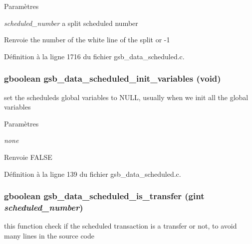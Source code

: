 \begin{DoxyParams}{Paramètres}
\item[{\em scheduled\_\-number}]a split scheduled number\end{DoxyParams}
\begin{DoxyReturn}{Renvoie}
the number of the white line of the split or -\/1 
\end{DoxyReturn}


Définition à la ligne 1716 du fichier gsb\_\-data\_\-scheduled.c.

\subsubsection[{gsb\_\-data\_\-scheduled\_\-init\_\-variables}]{\setlength{\rightskip}{0pt plus 5cm}gboolean gsb\_\-data\_\-scheduled\_\-init\_\-variables (void)}\label{gsb__data__scheduled_8c_a51f5cc190c15cd32d416a85460ac60a8}
set the scheduleds global variables to NULL, usually when we init all the global variables 
\begin{DoxyParams}{Paramètres}
\item[{\em none}]\end{DoxyParams}
\begin{DoxyReturn}{Renvoie}
FALSE 
\end{DoxyReturn}


Définition à la ligne 139 du fichier gsb\_\-data\_\-scheduled.c.

\subsubsection[{gsb\_\-data\_\-scheduled\_\-is\_\-transfer}]{\setlength{\rightskip}{0pt plus 5cm}gboolean gsb\_\-data\_\-scheduled\_\-is\_\-transfer (gint {\em scheduled\_\-number})}\label{gsb__data__scheduled_8c_ac1e3380ad4b688fb30af2fe5bbe28b5d}
this function check if the scheduled transaction is a transfer or not, to avoid many lines in the source code


